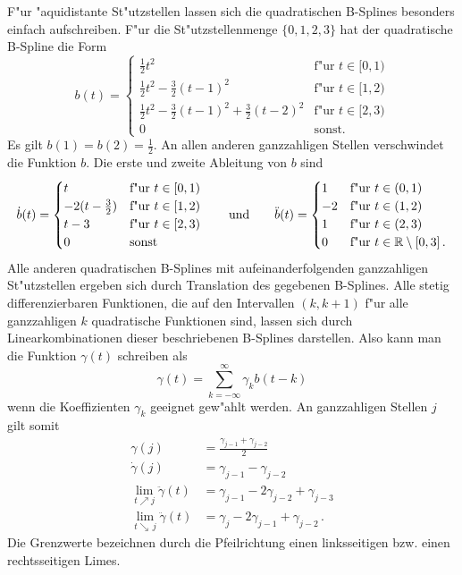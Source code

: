 \documentclass[a4paper]{scrartcl}
\newcommand{\R}{{\mathbb{R}}}
\begin{document}
F"ur "aquidistante St"utzstellen lassen sich die quadratischen B-Splines besonders einfach aufschreiben. 
F"ur die St"utzstellenmenge $\{0,1,2,3\}$ hat der quadratische B-Spline die Form
$$ b(t)=\begin{cases}
\frac12t^2 & \text{f"ur $t\in[0,1)$} \\
\frac12t^2-\frac32(t-1)^2 & \text{f"ur $t\in[1,2)$} \\
\frac12t^2-\frac32(t-1)^2+\frac32(t-2)^2 & \text{f"ur $t\in[2,3)$} \\
0 & \text{sonst.}
\end{cases} $$
Es gilt $b(1)=b(2)=\frac12$. 
An allen anderen ganzzahligen Stellen verschwindet die Funktion $b$. 
Die erste und zweite Ableitung von $b$ sind
$$ \dot b(t)=\begin{cases}
t & \text{f"ur $t\in[0,1)$} \\
-2(t-\frac32) & \text{f"ur $t\in[1,2)$} \\
t-3 & \text{f"ur $t\in[2,3)$} \\
0 & \text{sonst}
\end{cases} 
\qquad \text{und} \qquad
\ddot b(t)=\begin{cases}
1 & \text{f"ur $t\in(0,1)$} \\
-2 & \text{f"ur $t\in(1,2)$} \\
1 & \text{f"ur $t\in(2,3)$} \\
0 & \text{f"ur $t\in\R\setminus[0,3]$\,.}
\end{cases} $$
Alle anderen quadratischen B-Splines mit aufeinanderfolgenden ganzzahligen St"utzstellen ergeben sich durch Translation des gegebenen B-Splines. 
Alle stetig differenzierbaren Funktionen, die auf den Intervallen $(k,k+1)$ f"ur alle ganzzahligen $k$ quadratische Funktionen sind, lassen sich durch Linearkombinationen dieser beschriebenen B-Splines darstellen. 
Also kann man die Funktion $\gamma(t)$ schreiben als
$$ \gamma(t) = \sum_{k=-\infty}^{\infty}\gamma_kb(t-k) $$
wenn die Koeffizienten $\gamma_k$ geeignet gew"ahlt werden. 
An ganzzahligen Stellen $j$ gilt somit
\begin{align*}
\gamma(j) &= \frac{\gamma_{j-1}+\gamma_{j-2}}{2} \\
\dot\gamma(j) &= \gamma_{j-1}-\gamma_{j-2} \\
\lim_{t\nearrow j}\ddot\gamma(t) &= \gamma_{j-1}-2\gamma_{j-2}+\gamma_{j-3} \\
\lim_{t\searrow\,j}\ddot\gamma(t) &= \gamma_{j}-2\gamma_{j-1}+\gamma_{j-2}\,.
\end{align*}
Die Grenzwerte bezeichnen durch die Pfeilrichtung einen linksseitigen bzw. einen rechtsseitigen Limes. 
\end{document}
